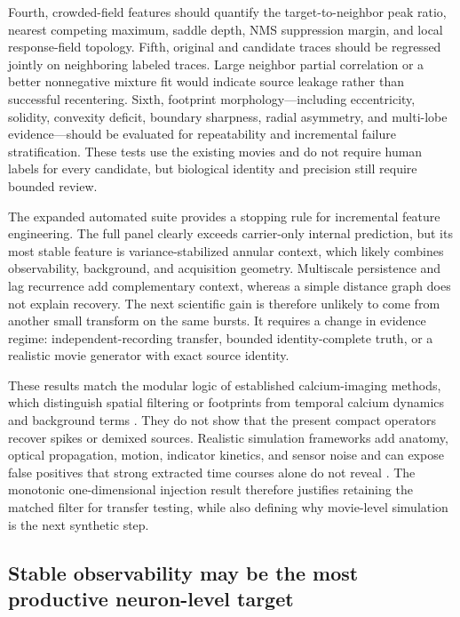 Fourth, crowded-field features should quantify the target-to-neighbor peak
ratio, nearest competing maximum, saddle depth, NMS suppression margin, and
local response-field topology. Fifth, original and candidate traces should be
regressed jointly on neighboring labeled traces. Large neighbor partial
correlation or a better nonnegative mixture fit would indicate source leakage
rather than successful recentering. Sixth, footprint morphology---including
eccentricity, solidity, convexity deficit, boundary sharpness, radial
asymmetry, and multi-lobe evidence---should be evaluated for repeatability and
incremental failure stratification. These tests use the existing movies and do
not require human labels for every candidate, but biological identity and
precision still require bounded review.

The expanded automated suite provides a stopping rule for incremental feature
engineering. The full panel clearly exceeds carrier-only internal prediction,
but its most stable feature is variance-stabilized annular context, which likely
combines observability, background, and acquisition geometry. Multiscale
persistence and lag recurrence add complementary context, whereas a simple
distance graph does not explain recovery. The next scientific gain is therefore
unlikely to come from another small transform on the same bursts. It requires a
change in evidence regime: independent-recording transfer, bounded
identity-complete truth, or a realistic movie generator with exact source
identity.

These results match the modular logic of established calcium-imaging methods,
which distinguish spatial filtering or footprints from temporal calcium
dynamics and background terms
\citep{vogelstein2010deconvolution,pnevmatikakis2016simultaneous,giovannucci2019caiman}.
They do not show that the present compact operators recover spikes or demixed
sources. Realistic simulation frameworks add anatomy, optical propagation,
motion, indicator kinetics, and sensor noise and can expose false positives
that strong extracted time courses alone do not reveal \citep{song2021naomi}.
The monotonic one-dimensional injection result therefore justifies retaining
the matched filter for transfer testing, while also defining why movie-level
simulation is the next synthetic step.

\subsection{Stable observability may be the most productive neuron-level target}

